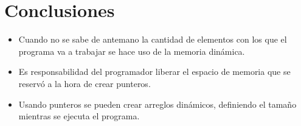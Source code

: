 \documentclass[11pt]{article}
\begin{document}
\section{Conclusiones}
\begin{itemize}
	\item Cuando no se sabe de antemano la cantidad de elementos con los que el programa va a trabajar se hace uso de la memoria dinámica.
	\item Es responsabilidad del programador liberar el espacio de memoria que se reservó a la hora de crear punteros.
	\item Usando punteros se pueden crear arreglos dinámicos, definiendo el tamaño mientras se ejecuta el programa.	
\end{itemize}
\end{document}
